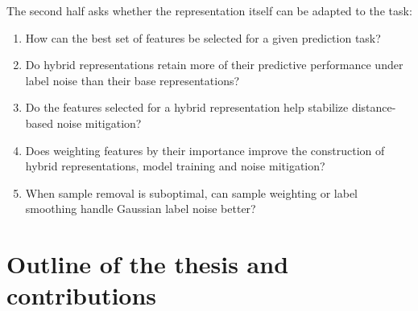 The second half asks whether the representation itself can be adapted to the task:\label{sec:intro:hybrid_questions}
\begin{enumerate}
    \item How can the best set of features be selected for a given prediction task?
    \item Do hybrid representations retain more of their predictive performance under label noise than their base representations?
    \item Do the features selected for a hybrid representation help stabilize distance-based noise mitigation?
    \item Does weighting features by their importance improve the construction of hybrid representations, model training and noise mitigation?
    \item When sample removal is suboptimal, can sample weighting or label smoothing handle Gaussian label noise better?
\end{enumerate}


\section{Outline of the thesis and contributions}

